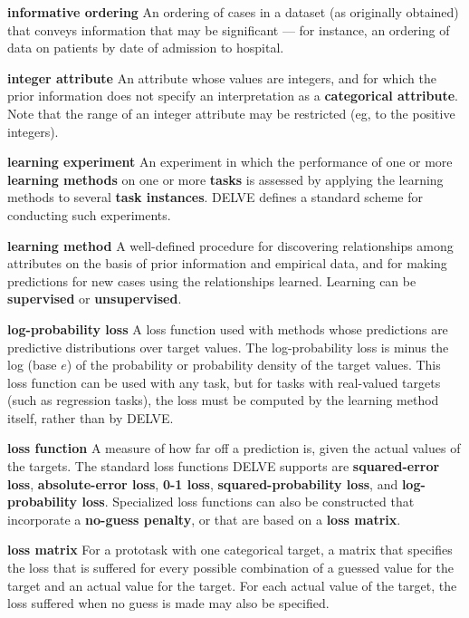 \begin{list}{}{%
\setlength{\itemsep}{0in}%
\setlength{\leftmargin}{2.25in}%
\setlength{\labelsep}{0in}%
\setlength{\labelwidth}{2.25in}}
\item[\bf informative ordering \hfill]
An ordering of cases in a dataset (as originally obtained)
that conveys information that may be significant --- for instance,
an ordering of data on patients by date of admission to hospital.

\item[\bf integer attribute \hfill]
An attribute whose values are integers, and for which the
prior information does not specify an interpretation as
a {\bf categorical attribute}.  Note that the range of
an integer attribute may be restricted (eg, to the positive
integers).

\item[\bf learning experiment \hfill]
An experiment in which the performance of one or more 
{\bf learning methods} on one or more {\bf tasks} is assessed 
by applying the learning methods to several {\bf task instances}.
DELVE defines a standard scheme for conducting such experiments.

\item[\bf learning method \hfill]
A well-defined procedure for discovering relationships among
attributes on the basis of prior information and empirical data, and 
for making predictions for new cases using the relationships 
learned.  Learning can be {\bf supervised} or {\bf unsupervised}.

\item[\bf log-probability loss \hfill]
A loss function used with methods whose predictions are predictive
distributions over target values.  The log-probability loss is minus the 
log (base $e$) of the probability or probability density of the target
values.  This loss function can be used with any task, but for tasks
with real-valued targets (such as regression tasks), the loss must be 
computed by the learning method itself, rather than by DELVE.

\item[\bf loss function \hfill]
A measure of how far off a prediction is, given the actual values of
the targets. The standard loss functions DELVE supports are
{\bf squared-error loss}, {\bf absolute-error loss}, {\bf 0-1 loss}, 
{\bf squared-probability loss}, and {\bf log-probability loss}.  Specialized
loss functions can also be constructed that incorporate a 
{\bf no-guess penalty}, or that are based on a {\bf loss matrix}.

\item[\bf loss matrix \hfill]
For a prototask with one categorical target, a matrix that specifies 
the loss that is suffered for every possible combination of a guessed
value for the target and an actual value for the target.  For each
actual value of the target, the loss suffered when no guess is made
may also be specified.


\end{list}
